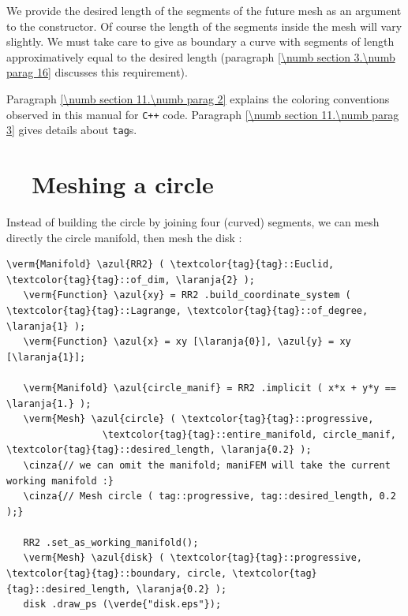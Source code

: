 We provide the desired length of the segments of the future mesh as an argument to the
constructor.
Of course the length of the segments inside the mesh will vary slightly.
We must take care to give as boundary a curve with segments of length approximatively equal
to the desired length (paragraph \ref{\numb section 3.\numb parag 16} discusses
this requirement).

Paragraph \ref{\numb section 11.\numb parag 2} explains the coloring conventions observed
in this manual for {\tt C++} code.
Paragraph \ref{\numb section 11.\numb parag 3} gives details about {\small\tt\textcolor{tag}{tag}}s.


\section{~~Meshing a circle}\label{\numb section 3.\numb parag 2}

Instead of building the circle by joining four (curved) segments, we can mesh directly
the circle manifold, then mesh the disk :

\begin{Verbatim}[commandchars=\\\{\},formatcom=\small\tt,frame=single,
   label=parag-\ref{\numb section 3.\numb parag 2}.cpp,rulecolor=\color{coment},
   baselinestretch=0.94,framesep=2mm                                            ]
   \verm{Manifold} \azul{RR2} ( \textcolor{tag}{tag}::Euclid, \textcolor{tag}{tag}::of_dim, \laranja{2} );
   \verm{Function} \azul{xy} = RR2 .build_coordinate_system ( \textcolor{tag}{tag}::Lagrange, \textcolor{tag}{tag}::of_degree, \laranja{1} );
   \verm{Function} \azul{x} = xy [\laranja{0}], \azul{y} = xy [\laranja{1}];
   
   \verm{Manifold} \azul{circle_manif} = RR2 .implicit ( x*x + y*y == \laranja{1.} );
   \verm{Mesh} \azul{circle} ( \textcolor{tag}{tag}::progressive,
                 \textcolor{tag}{tag}::entire_manifold, circle_manif, \textcolor{tag}{tag}::desired_length, \laranja{0.2} );
   \cinza{// we can omit the manifold; maniFEM will take the current working manifold :}
   \cinza{// Mesh circle ( tag::progressive, tag::desired_length, 0.2 );}
   
   RR2 .set_as_working_manifold();
   \verm{Mesh} \azul{disk} ( \textcolor{tag}{tag}::progressive, \textcolor{tag}{tag}::boundary, circle, \textcolor{tag}{tag}::desired_length, \laranja{0.2} );
   disk .draw_ps (\verde{"disk.eps"});
\end{Verbatim}

